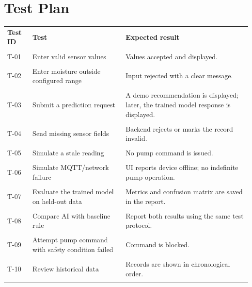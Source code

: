 \documentclass[12pt,a4paper]{report}
\begin{document}
\section{Test Plan}

\begin{longtable}{p{}p{}p{}}

\toprule

\textbf{Test ID} & \textbf{Test} & \textbf{Expected result}\\\\

\midrule

T-01 & Enter valid sensor values & Values accepted and displayed.\\\\

T-02 & Enter moisture outside configured range & Input rejected with a clear message.\\\\

T-03 & Submit a prediction request & A demo recommendation is displayed; later, the trained model response is displayed.\\\\

T-04 & Send missing sensor fields & Backend rejects or marks the record invalid.\\\\

T-05 & Simulate a stale reading & No pump command is issued.\\\\

T-06 & Simulate MQTT/network failure & UI reports device offline; no indefinite pump operation.\\\\

T-07 & Evaluate the trained model on held-out data & Metrics and confusion matrix are saved in the report.\\\\

T-08 & Compare AI with baseline rule & Report both results using the same test protocol.\\\\

T-09 & Attempt pump command with safety condition failed & Command is blocked.\\\\

T-10 & Review historical data & Records are shown in chronological order.\\\\

\bottomrule

\end{longtable}
\end{document}
